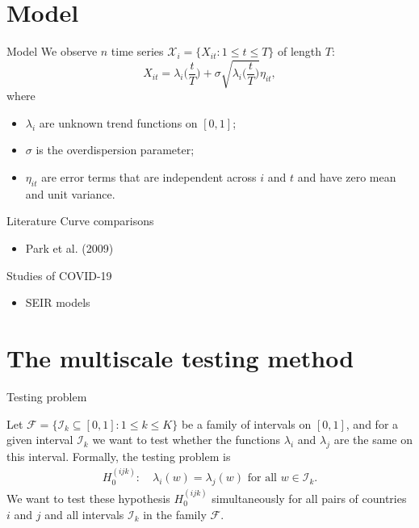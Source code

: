 \documentclass[10pt]{beamer}
\begin{document}
\section{Model}
\begin{frame}{Model}
We observe $n$ time series $\mathcal{X}_i = \{X_{it}: 1 \le t \le T \}$ of length $T$:
\begin{equation*}
X_{it} = \lambda_i \Big( \frac{t}{T} \Big) + \sigma\sqrt{\lambda_i \Big( \frac{t}{T} \Big)} \eta_{it},
\end{equation*}\pause
\vspace{-3mm}
where
\begin{itemize}
\item $\lambda_i$ are unknown trend functions on $[0,1]$;
\item $\sigma$ is the overdispersion parameter;
\item $\eta_{it}$ are error terms that are independent across $i$ and $t$ and have zero mean and unit variance.
\end{itemize}
\end{frame}

\begin{frame}{Literature}
	Curve comparisons
	\begin{itemize}
		\item Park et al. (2009)
	\end{itemize}\pause
	Studies of COVID-19
	\begin{itemize}
		\item SEIR models
	\end{itemize}
\end{frame}

\section{The multiscale testing method}
\begin{frame}{Testing problem}

Let $\mathcal{F} =\{ \mathcal{I}_k \subseteq [0, 1]: 1 \le k \le K\}$ be a family of intervals on $[0, 1]$, and for a given interval $\mathcal{I}_k$ we want to test whether the functions $\lambda_i$ and $\lambda_j$ are the same on this interval. Formally, the testing problem is
\begin{align*}
H_0^{(ijk)}:\quad  \lambda_i(w) = \lambda_j(w) \text{ for all } w\in \mathcal{I}_k.
\end{align*}\pause
We want to test these hypothesis $H_0^{(ijk)}$ simultaneously for all pairs of countries $i$ and $j$ and all intervals $\mathcal{I}_k$ in the family $\mathcal{F}$.
\end{frame} 
\end{document}
